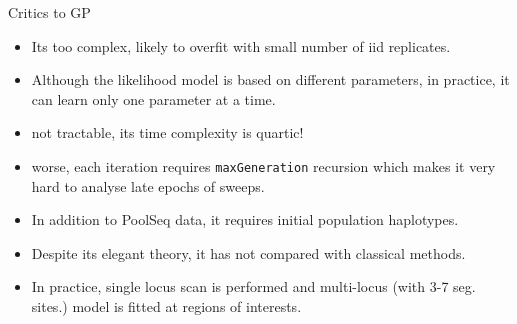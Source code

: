 \documentclass[t]{beamer} %
\begin{document}
\begin{frame}{Critics to GP}
\begin{itemize}
\item Its too complex, likely to overfit with small number of iid replicates.
\item Although the likelihood model is based on different parameters, in practice, it can learn only one parameter at a time.
\item not tractable, its time complexity is quartic!
\item worse, each iteration requires \texttt{maxGeneration} recursion which makes it very hard to analyse late epochs of sweeps.
\item In addition to PoolSeq data, it requires initial population haplotypes.
\item Despite its elegant theory, it has not compared with classical methods.
\item In practice, single locus scan is performed and multi-locus (with 3-7 seg. sites.) model is fitted at regions of interests.
\end{itemize}
\end{frame}
\end{document}
